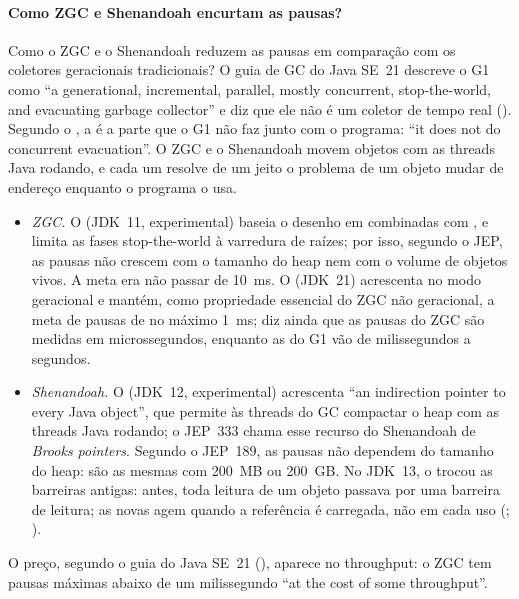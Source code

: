 \paragraph{Como ZGC e Shenandoah encurtam as pausas?}
Como o ZGC e o Shenandoah reduzem as pausas  em comparação com os coletores geracionais tradicionais? O
guia de GC do Java SE~21 descreve o G1 como \enquote{a generational,
incremental, parallel, mostly concurrent, stop-the-world, and evacuating
garbage collector} e diz que ele não é um coletor de tempo real
(). Segundo o , a
 é a parte que o G1 não faz
junto com o programa: \enquote{it does not do concurrent evacuation}. O ZGC e o Shenandoah movem objetos com as
threads Java rodando, e cada um resolve de um jeito o problema de um
objeto mudar de endereço enquanto o programa o usa.
\begin{itemize}
\item \emph{ZGC.} O  (JDK~11, experimental) baseia
  o desenho em  combinadas com , e limita as fases stop-the-world à varredura de raízes; por
  isso, segundo o JEP, as pausas não crescem com o tamanho do heap nem com
  o volume de objetos vivos. A meta era não passar de 10~ms. O
   (JDK~21) acrescenta  no modo
  geracional e mantém, como propriedade essencial do ZGC não geracional,
  a meta de pausas de no máximo 1~ms; diz ainda que as pausas do ZGC são
  medidas em microssegundos, enquanto as do G1 vão de milissegundos a
  segundos.
\item \emph{Shenandoah.} O  (JDK~12, experimental)
  acrescenta \enquote{an indirection pointer to every Java object}, que
  permite às threads do GC compactar o heap com as threads Java rodando;
  o JEP~333 chama esse recurso do Shenandoah de \emph{Brooks pointers}.
  Segundo o JEP~189, as pausas não dependem do tamanho do heap: são as
  mesmas com 200~MB ou 200~GB. No JDK~13, o
   trocou as barreiras antigas: antes, toda
  leitura de um objeto passava por uma barreira de leitura; as novas agem
  quando a referência é carregada, não em cada uso
  (; ).
\end{itemize}
O preço, segundo o guia do Java SE~21 (),
aparece no throughput: o ZGC tem
pausas máximas abaixo de um milissegundo \enquote{at the cost of some
throughput}.

